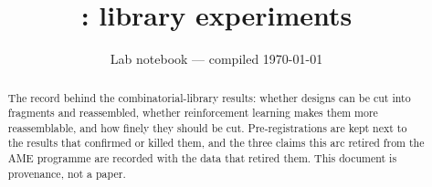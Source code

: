 \documentclass[11pt]{article}
\title{\cleo{}: library experiments}
\author{}
\date{Lab notebook --- compiled \today}
\begin{document}
\maketitle
\thispagestyle{empty}

\begin{abstract}
\noindent
The record behind the combinatorial-library results: whether designs can be cut
into fragments and reassembled, whether reinforcement learning makes them more
reassemblable, and how finely they should be cut. Pre-registrations are kept
next to the results that confirmed or killed them, and the three claims this arc
retired from the AME programme are recorded with the data that retired them.
This document is provenance, not a paper.
\end{abstract}

\clearpage
\tableofcontents
\clearpage


\end{document}
